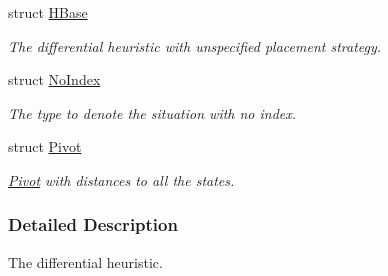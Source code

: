 \begin{DoxyCompactItemize}
struct \hyperlink{structslb_1_1ext_1_1heuristic_1_1differential_1_1HBase}{H\+Base}
\begin{DoxyCompactList}\small\item\em The differential heuristic with unspecified placement strategy. \end{DoxyCompactList}\item 
struct \hyperlink{structslb_1_1ext_1_1heuristic_1_1differential_1_1NoIndex}{No\+Index}
\begin{DoxyCompactList}\small\item\em The type to denote the situation with no index. \end{DoxyCompactList}\item 
struct \hyperlink{structslb_1_1ext_1_1heuristic_1_1differential_1_1Pivot}{Pivot}
\begin{DoxyCompactList}\small\item\em \hyperlink{structslb_1_1ext_1_1heuristic_1_1differential_1_1Pivot}{Pivot} with distances to all the states. \end{DoxyCompactList}\end{DoxyCompactItemize}


\subsubsection{Detailed Description}
The differential heuristic. 